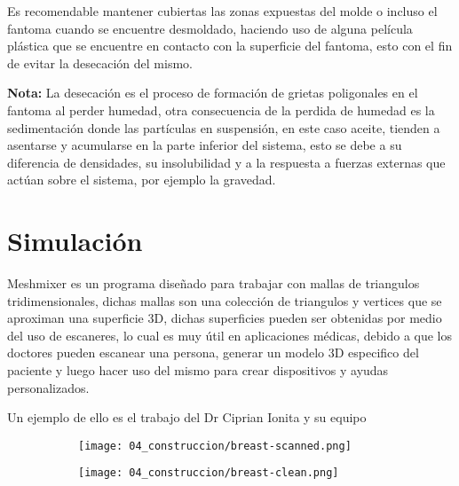 Es recomendable mantener cubiertas las zonas expuestas del molde o incluso el fantoma cuando se encuentre desmoldado, haciendo uso de alguna película plástica que se encuentre en contacto con la superficie del fantoma, esto con el fin de evitar la desecación del mismo.

\textbf{Nota:}
La desecación es el proceso de formación de grietas poligonales en el fantoma al perder humedad, otra consecuencia de la perdida de humedad es la sedimentación donde las partículas en suspensión, en este caso aceite, tienden a asentarse y acumularse en la parte inferior del sistema, esto se debe a su diferencia de densidades, su insolubilidad y a la respuesta a fuerzas externas que actúan sobre el sistema, por ejemplo la gravedad.

\section{Simulación}

Meshmixer es un programa diseñado para trabajar con mallas de triangulos tridimensionales, dichas mallas son una colección de triangulos y vertices que se aproximan una superficie 3D, dichas superficies pueden ser obtenidas por medio del uso de escaneres, lo cual es muy útil en aplicaciones médicas, debido a que los doctores pueden escanear una persona, generar un modelo 3D especifico del paciente y luego hacer uso del mismo para crear dispositivos y ayudas personalizados.

Un ejemplo de ello es el trabajo del Dr Ciprian Ionita y su equipo \cite{ A029:kurenov2015three}


    \begin{figure}[H]
    \centering
    \begin{subfigure}[t]{0.45\textwidth}
        \centering
         \texttt{[image: 04\_construccion/breast-scanned.png]}
    \end{subfigure}
    \begin{subfigure}[t]{0.45\textwidth}
        \centering
        \texttt{[image: 04\_construccion/breast-clean.png]}
    \end{subfigure} 
    \end{figure}

